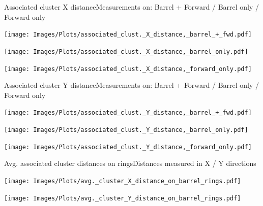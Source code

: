 \documentclass{beamer}
\begin{document}
\begin{frame}{Associated cluster X distance}{Measurements on: Barrel + Forward / Barrel only / Forward only}
   \begin{minipage}{0.32\textwidth}
    \centering
    \texttt{[image: Images/Plots/associated\_clust.\_X\_distance,\_barrel\_+\_fwd.pdf]}
  \end{minipage}%
  \hspace{0.01\textwidth}%
  \begin{minipage}{0.32\textwidth}
    \centering
    \texttt{[image: Images/Plots/associated\_clust.\_X\_distance,\_barrel\_only.pdf]}
  \end{minipage}%
  \hspace{0.01\textwidth}%
  \begin{minipage}{0.32\textwidth}
    \centering
    \texttt{[image: Images/Plots/associated\_clust.\_X\_distance,\_forward\_only.pdf]}
  \end{minipage}
\end{frame}

\begin{frame}{Associated cluster Y distance}{Measurements on: Barrel + Forward / Barrel only / Forward only}
  \begin{minipage}{0.32\textwidth}
    \centering
    \texttt{[image: Images/Plots/associated\_clust.\_Y\_distance,\_barrel\_+\_fwd.pdf]}
  \end{minipage}%
  \hspace{0.01\textwidth}%
  \begin{minipage}{0.32\textwidth}
    \centering
    \texttt{[image: Images/Plots/associated\_clust.\_Y\_distance,\_barrel\_only.pdf]}
  \end{minipage}%
  \hspace{0.01\textwidth}%
  \begin{minipage}{0.32\textwidth}
    \centering
    \texttt{[image: Images/Plots/associated\_clust.\_Y\_distance,\_forward\_only.pdf]}
  \end{minipage}
\end{frame}

\begin{frame}{Avg. associated cluster distances on rings}{Distances measured in X / Y directions}
  \begin{minipage}{0.49\textwidth}
    \centering
    \texttt{[image: Images/Plots/avg.\_cluster\_X\_distance\_on\_barrel\_rings.pdf]}
  \end{minipage}%
  \hspace{0.01\textwidth}%
  \begin{minipage}{0.49\textwidth}
    \centering
    \texttt{[image: Images/Plots/avg.\_cluster\_Y\_distance\_on\_barrel\_rings.pdf]}
  \end{minipage}%
\end{frame}
\end{document}
